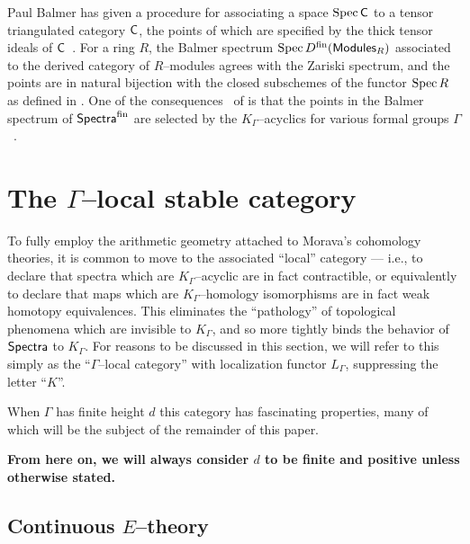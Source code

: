 \begin{remark}
Paul Balmer has given a procedure for associating a space $\operatorname{Spec} \mathsf{C}$ to a tensor triangulated category $\mathsf{C}$, the points of which are specified by the thick tensor ideals of $\mathsf{C}$~\cite{Balmer}.  For a ring $R$, the Balmer spectrum $\operatorname{Spec} D^{\text{fin}}(\mathsf{Modules}_R)$ associated to the derived category of $R$--modules agrees with the Zariski spectrum, and the points are in natural bijection with the closed subschemes of the functor $\operatorname{Spec} R$ as defined in .  One of the consequences~\cite[Theorem 7]{HopkinsSmith} of  is that the points in the Balmer spectrum of $\mathsf{Spectra}^{\text{fin}}$ are selected by the $K_\Gamma$--acyclics for various formal groups $\Gamma$~\cite[Corollary 9.5]{Balmer}.
\end{remark}




\section*{The $\Gamma$--local stable category}\label{KLocalCategory}

To fully employ the arithmetic geometry attached to Morava's cohomology theories, it is common to move to the associated ``local'' category --- i.e., to declare that spectra which are $K_\Gamma$--acyclic are in fact contractible, or equivalently to declare that maps which are $K_\Gamma$--homology isomorphisms are in fact weak homotopy equivalences.  This eliminates the ``pathology'' of topological phenomena which are invisible to $K_\Gamma$, and so more tightly binds the behavior of $\mathsf{Spectra}$ to $K_\Gamma$.  For reasons to be discussed in this section, we will refer to this simply as the ``$\Gamma$--local category'' with localization functor $L_\Gamma$, suppressing the letter ``$K$''.

When $\Gamma$ has finite height $d$ this category has fascinating properties, many of which will be the subject of the remainder of this paper.

\begin{center}
\textbf{From here on, we will always consider $d$ to be finite and positive unless otherwise stated.}
\end{center}

\subsection*{Continuous $E$--theory}\label{sec:ContinuousEThy}


